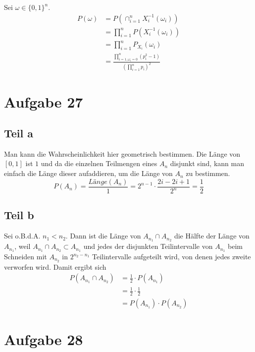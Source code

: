 \documentclass[10pt,a4paper]{article}
\begin{document}
Sei $\omega \in \{ 0, 1 \}^{n}$.
\begin{align*}
  P(\omega) & = P \left( \cap_{i = 1}^{n} X_{i}^{-1}(\omega_{i}) \right)\\
  & = \prod_{i = 1}^{n} P \left( X_{i}^{-1}(\omega_{i}) \right)\\
  & = \prod_{i = 1}^{n} P_{X_{i}}(\omega_{i})\\
  & = \frac{\prod_{i = 1, \omega_{i} = 0}^{n} (p_{i}^{2} - 1)}{\left( \prod_{i = 1}^{n} p_{i} \right)^{2}}
\end{align*}

\section{Aufgabe 27}

\subsection{Teil a}
Man kann die Wahrscheinlichkeit hier geometrisch bestimmen.
Die Länge von $[0, 1]$ ist $1$ und da die einzelnen Teilmengen eines $A_{n}$ disjunkt sind, kann man einfach die Länge dieser aufaddieren, um die Länge von $A_{n}$ zu bestimmen.
\begin{equation}
  P(A_{n}) = \frac{\textit{Länge}(A_{n})}{1} = 2^{n - 1} \cdot \frac{2i - 2i + 1}{2^{n}} = \frac{1}{2}
\end{equation}

\subsection{Teil b}
Sei o.B.d.A. $n_{1} < n_{2}$.
Dann ist die Länge von $A_{n_{1}} \cap A_{n_{2}}$ die Hälfte der Länge von $A_{n_{1}}$, weil $A_{n_{1}} \cap A_{n_{2}} \subset A_{n_{1}}$ und jedes der disjunkten Teilintervalle von $A_{n_{1}}$ beim Schneiden mit $A_{n_{2}}$ in $2^{n_{2} - n_{1}}$ Teilintervalle aufgeteilt wird, von denen jedes zweite verworfen wird.
Damit ergibt sich
\begin{align*}
  P(A_{n_{1}} \cap A_{n_{2}}) & = \frac{1}{2} \cdot P(A_{n_{1}})\\
  & = \frac{1}{2} \cdot \frac{1}{2}\\
  & = P(A_{n_{1}}) \cdot P(A_{n_{2}})
\end{align*}

\section{Aufgabe 28}
\end{document}
